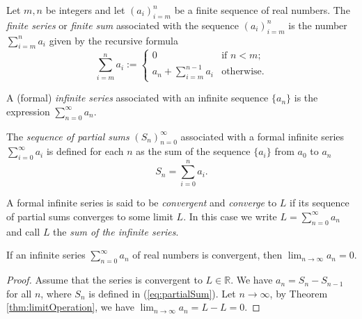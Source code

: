 \begin{defn}
  Let $m,n$ be integers
  and let $(a_i)_{i=m}^n$ be a finite sequence of real numbers.
  The \emph{finite series} or \emph{finite sum} associated with the sequence
  $(a_i)_{i=m}^n$ is the number $\sum_{i=m}^n a_i$
  given by the recursive formula
  \begin{equation}
    \label{eq:finiteSeries}
    \sum_{i=m}^n a_i :=
    \begin{cases}
      0 & \text{if } n< m;
      \\
      a_n + \sum_{i=m}^{n-1} a_i & \text{otherwise}.
    \end{cases}
  \end{equation}
\end{defn}

\begin{defn}
  \label{def:seriesFromSequence}
  A (formal) \emph{infinite series} associated with an infinite sequence $\{a_n\}$
   is the expression $\sum_{n=0}^{\infty} a_n$.
\end{defn}

\begin{defn}
  The \emph{sequence of partial sums} $(S_n)_{n=0}^{\infty}$ associated
  with a formal infinite series
  $\sum_{i=0}^{\infty} a_i$
  is defined for each $n$ as the sum of the sequence $\{a_i\}$
  from $a_0$ to $a_n$
  \begin{equation}
    \label{eq:partialSum}
    S_n = \sum_{i=0}^{n} a_i.
  \end{equation}
\end{defn}

\begin{defn}
  A formal infinite series is said to be \emph{convergent}
  and \emph{converge} to $L$
  if its sequence of partial sums converges to some limit $L$.
  In this case we write $L=\sum_{n=0}^{\infty} a_n$
  and call $L$ the \emph{sum of the infinite series}.
\end{defn}

\begin{lem}
  \label{lem:seriesConvergeNecessity}
  If an infinite series $\sum_{n=0}^{\infty}a_{n}$ of real numbers
  is convergent, then $\lim_{n\rightarrow \infty}a_{n}=0$.
\end{lem}
\begin{proof}
  Assume that the series is convergent to $L\in \mathbb{R}$.
  We have $a_{n}=S_{n}-S_{n-1}$ for all $n$, where $S_{n}$ is defined
  in (\ref{eq:partialSum}). Let $n\rightarrow \infty$, by
  Theorem \ref{thm:limitOperation}, we have
  $\lim_{n\rightarrow \infty}a_{n}=L-L=0$.
\end{proof}

